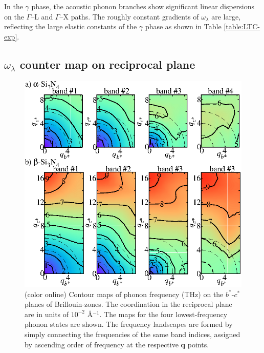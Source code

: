 \documentclass[twocolumn,amsmath,amssymb,a4paper,prb,superscriptaddress,floatfix]{revtex4-1}
\begin{document}
In the $\gamma$ phase, the acoustic phonon branches show significant linear
dispersions on the $\Gamma$--L and $\Gamma$--X paths.  The roughly constant
gradients of $\omega_{\lambda}$ are large, reflecting the large elastic
constants of the $\gamma$ phase as shown in Table \ref{table:LTC-exp}.

\subsection{$\omega_\lambda$ counter map on reciprocal plane}

\begin{figure}[ht]
 \centerins
  \includegraphics[width=\linewidth]{Fig2_small.eps} \caption{(color
  online) Contour maps of phonon frequency (THz) on the $b^*$-$c^*$
  planes of Brillouin-zones. The coordination in the reciprocal plane 
   are in units of $10^{-2}$ \AA$^{-1}$. The maps for the four lowest-frequency
  phonon states are shown. The frequency landscapes are formed by simply
  connecting the frequencies of the same band indices, assigned by
  ascending order of frequency at the respective $\mathbf {q}$
  points. \label{fig:Fig3_338} }
 \centering
\end{figure}
\end{document}
